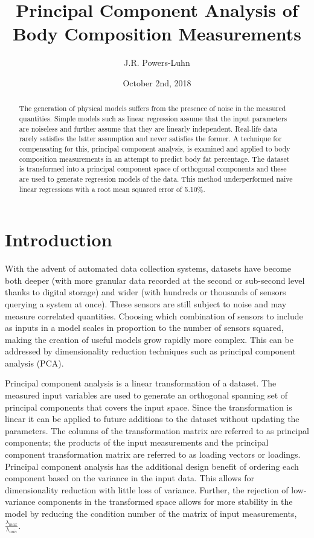 \documentclass{IEEEtran}
\author{J.R. Powers-Luhn}
\title{Principal Component Analysis of Body Composition Measurements}
\date{October 2nd, 2018}
\begin{document}
\maketitle

\begin{abstract}

The generation of physical models suffers from the presence of noise in the measured quantities. Simple models such as linear regression assume that the input parameters are noiseless and further assume that they are linearly independent. Real-life data rarely satisfies the latter assumption and never satisfies the former. A technique for compensating for this, principal component analysis, is examined and applied to body composition measurements in an attempt to predict body fat percentage. The dataset is transformed into a principal component space of orthogonal components and these are used to generate regression models of the data. This method underperformed naive linear regressions with a root mean squared error of \num{5.10}\%.

\end{abstract}

\section{Introduction}

With the advent of automated data collection systems, datasets have become both deeper (with more granular data recorded at the second or sub-second level thanks to digital storage) and wider (with hundreds or thousands of sensors querying a system at once). These sensors are still subject to noise and may measure correlated quantities. Choosing which combination of sensors to include as inputs in a model scales in proportion to the number of sensors squared, making the creation of useful models grow rapidly more complex. This can be addressed by dimensionality reduction techniques such as principal component analysis (PCA). 

Principal component analysis is a linear transformation of a dataset. The measured input variables are used to generate an orthogonal spanning set of principal components that covers the input space. Since the transformation is linear it can be applied to future additions to the dataset without updating the parameters. The columns of the transformation matrix are referred to as principal components; the products of the input measurements and the principal component transformation matrix are referred to as loading vectors or loadings. Principal component analysis has the additional design benefit of ordering each component based on the variance in the input data. This allows for dimensionality reduction with little loss of variance. Further, the rejection of low-variance components in the transformed space allows for more stability in the model by reducing the condition number of the matrix of input measurements, $\frac{\lambda_{max}}{\lambda_{min}}$.
\end{document}
